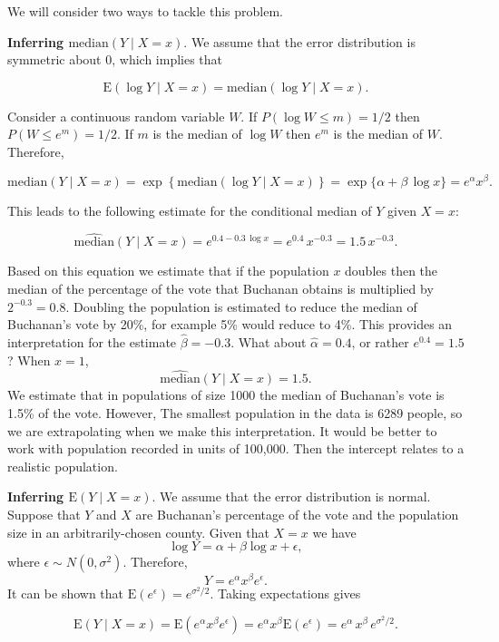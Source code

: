 \documentclass[
  british,
  11pt,
  openany, a4paper]{book}
\begin{document}
We will consider two ways to tackle this problem.

\textbf{Inferring \(\text{median}(Y \mid X = x).\)} We assume that the error distribution is symmetric about 0, which implies that

\[ \text{E}(\log Y \mid X=x) = \text{median}(\log Y \mid X=x). \]

Consider a continuous random variable \(W\). If \(P(\log W \leq m) = 1/2\) then \(P(W \leq e^m) = 1/2\). If \(m\) is the median of \(\log W\) then \(e^m\) is the median of \(W\). Therefore,

\[ \text{median}(Y \mid X=x) = \exp \left\{ \text{median}(\log Y \mid X=x) \right\} = \exp \{ \alpha + \beta \, \log x\} = e^\alpha x^\beta. \]

This leads to the following estimate for the conditional median of \(Y\) given \(X = x\):

\[ \widehat{\text{median}}(Y \mid X=x) = e^{0.4 - 0.3\,\log x} = e^{0.4}\,x^{-0.3} = 1.5\,x^{-0.3}. \]

Based on this equation we estimate that if the population \(x\) doubles then the median of the percentage of the vote that Buchanan obtains is multiplied by \(2^{-0.3}=0.8\). Doubling the population is estimated to reduce the median of Buchanan's vote by 20\%, for example 5\% would reduce to 4\%. This provides an interpretation for the estimate \(\hat{\beta} = -0.3\). What about \(\hat{\alpha}=0.4\), or rather \(e^{0.4}=1.5\)? When \(x=1\),
\[ \widehat{\text{median}}(Y \mid X=x) = 1.5. \]
We estimate that in populations of size 1000 the median of Buchanan's vote is 1.5\% of the vote. However, The smallest population in the data is 6289 people, so we are extrapolating when we make this interpretation. It would be better to work with population recorded in units of 100,000. Then the intercept relates to a realistic population.

\textbf{Inferring \(\text{E}(Y \mid X = x).\)} We assume that the error distribution is normal. Suppose that \(Y\) and \(X\) are Buchanan's percentage of the vote and the population size in an arbitrarily-chosen county. Given that \(X=x\) we have
\[ \log Y = \alpha + \beta \log x + \epsilon, \]
where \(\epsilon \sim N(0,\sigma^2)\). Therefore,
\[ Y = e^\alpha x^\beta e^\epsilon. \]
It can be shown that \(\text{E}\left(e^\epsilon\right)=e^{\sigma^2/2}\). Taking expectations gives

\[ \text{E}(Y \mid X=x) = \text{E}( e^\alpha x^\beta e^\epsilon)
= e^\alpha x^\beta \text{E}\left( e^\epsilon \right)
= e^\alpha \, x^\beta \, e^{\sigma^2/2}. \]
\end{document}
